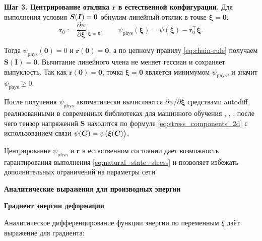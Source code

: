 \textbf{Шаг 3. Центрирование отклика $\mathbf{r}$ в естественной конфигурации.}
Для выполнения условия $\boldsymbol{S}(\boldsymbol{I})=\boldsymbol{0}$ обнулим линейный отклик в точке 
$\boldsymbol{\xi}=\mathbf{0}$:
\begin{equation}
  \mathbf{r}_0 := \frac{\partial \psi}{\partial \boldsymbol{\xi}}\bigg|_{\boldsymbol{\xi}=\mathbf{0}},\qquad
  \psi_{\mathrm{phys}}(\boldsymbol{\xi}) = \psi(\boldsymbol{\xi}) - \mathbf{r}_0^{\top}\boldsymbol{\xi}.
  \label{eq:phys_energy}
\end{equation}

Тогда $\psi_{\mathrm{phys}}(\mathbf{0})=0$ и $\mathbf{r}(\mathbf{0})=\mathbf{0}$, 
а по цепному правилу \eqref{eq:chain-rule} получаем $\mathbf{S}(\mathbf{I})=\mathbf{0}$. 
Вычитание линейного члена не меняет гессиан и сохраняет выпуклость. 
Так как $\mathbf{r}(\mathbf{0})=\mathbf{0}$, точка $\boldsymbol{\xi}=\mathbf{0}$ является минимумом 
$\psi_{\mathrm{phys}}$, и значит $\psi_{\mathrm{phys}}\ge 0$.

После получения $\psi_{\mathrm{phys}}$ автоматически вычисляются 
$\partial\psi/\partial\boldsymbol{\xi}$ средствами autodiff, реализованными в современных библиотеках для машинного обучения 
\cite{pytorch2019}, \cite{tensorflow2016}, \cite{jax2018}, 
после чего тензор напряжений $\mathbf{S}$ находится по формуле \eqref{eq:stress_components_2d} с 
использованием связи $\psi(\boldsymbol{C})=\psi\big(\boldsymbol{\xi}(\boldsymbol{C})\big)$.

Центрирование $\psi_{\mathrm{phys}}$ и $\mathbf{r}$ в естественном состоянии 
дает возможность гарантирования выполнения \eqref{eq:natural_state_stress} и
позволяет избежать дополнительных ограничений на параметры сети






\textbf{Аналитические выражения для производных энергии}

\textbf{Градиент энергии деформации}

Аналитическое дифференцирование функции энергии по переменным \(\xi\) даёт выражение для градиента:

